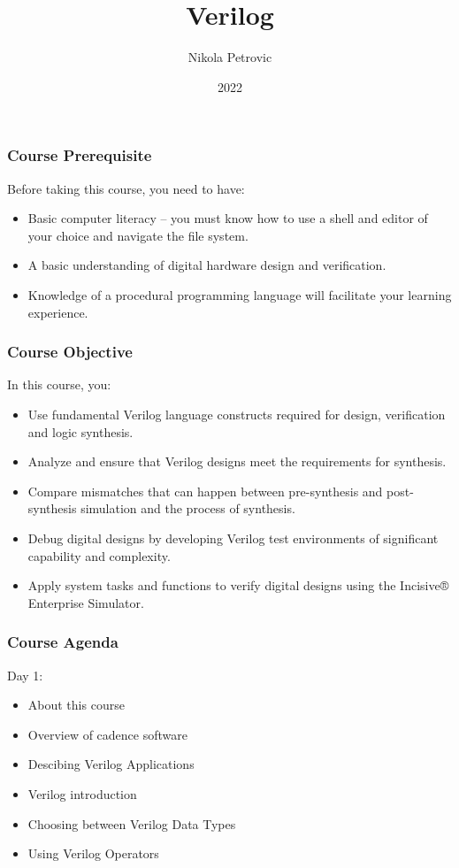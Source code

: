 \documentclass[t]{beamer}
\title{Verilog}
\author{Nikola Petrovic}
\institute{University of Belgrade, School of Electrical Engineering}
\date{2022}
\begin{document}
\frame{\titlepage}

\begin{frame}
\frametitle{Course Prerequisite}

Before taking this course, you need to have:
\begin{itemize}
\item Basic computer literacy – you must know how to use a shell and editor of your choice and navigate the file system.
\item A basic understanding of digital hardware design and verification.
\item Knowledge of a procedural programming language will facilitate your learning experience.
\end{itemize}

\end{frame}

\begin{frame}
\frametitle{Course Objective}

In this course, you: 
\begin{itemize}

\item Use fundamental Verilog language constructs required for design, verification and logic synthesis.
\item Analyze and ensure that Verilog designs meet the requirements for synthesis.
\item Compare mismatches that can happen between pre-synthesis and post-synthesis simulation and the process of synthesis.
\item Debug digital designs by developing Verilog test environments of significant capability and complexity.
\item Apply system tasks and functions to verify digital designs using the Incisive® Enterprise Simulator.
\end{itemize}

\end{frame}

\begin{frame}
\frametitle{Course Agenda}
Day 1:
\begin{itemize}
\item About this course
\item Overview of cadence software
\item Descibing Verilog Applications
\item Verilog introduction
\item Choosing between Verilog Data Types
\item Using Verilog Operators
\end{itemize}

\end{frame}
\end{document}
